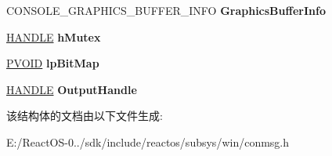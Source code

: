\begin{DoxyCompactItemize}
C\+O\+N\+S\+O\+L\+E\+\_\+\+G\+R\+A\+P\+H\+I\+C\+S\+\_\+\+B\+U\+F\+F\+E\+R\+\_\+\+I\+N\+FO {\bfseries Graphics\+Buffer\+Info}
\item 
\mbox{\label{struct___c_o_n_s_o_l_e___c_r_e_a_t_e_s_c_r_e_e_n_b_u_f_f_e_r_a746a31f5a53161ec9ac066c8a6ea595e}} 
\hyperlink{interfacevoid}{H\+A\+N\+D\+LE} {\bfseries h\+Mutex}
\item 
\mbox{\label{struct___c_o_n_s_o_l_e___c_r_e_a_t_e_s_c_r_e_e_n_b_u_f_f_e_r_aee81e333b0fbd63661f131d9c56e478a}} 
\hyperlink{interfacevoid}{P\+V\+O\+ID} {\bfseries lp\+Bit\+Map}
\item 
\mbox{\label{struct___c_o_n_s_o_l_e___c_r_e_a_t_e_s_c_r_e_e_n_b_u_f_f_e_r_a841c24425e1e19574258faaf5aa8b305}} 
\hyperlink{interfacevoid}{H\+A\+N\+D\+LE} {\bfseries Output\+Handle}
\end{DoxyCompactItemize}


该结构体的文档由以下文件生成\+:\begin{DoxyCompactItemize}
\item 
E\+:/\+React\+O\+S-\/0../sdk/include/reactos/subsys/win/conmsg.\+h\end{DoxyCompactItemize}
